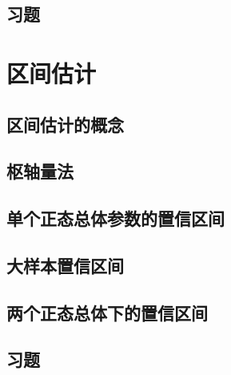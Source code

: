 \subsection{习题}

\section{区间估计}
\subsection{区间估计的概念}
\subsection{枢轴量法}
\subsection{单个正态总体参数的置信区间}
\subsection{大样本置信区间}
\subsection{两个正态总体下的置信区间}
\subsection{习题}
